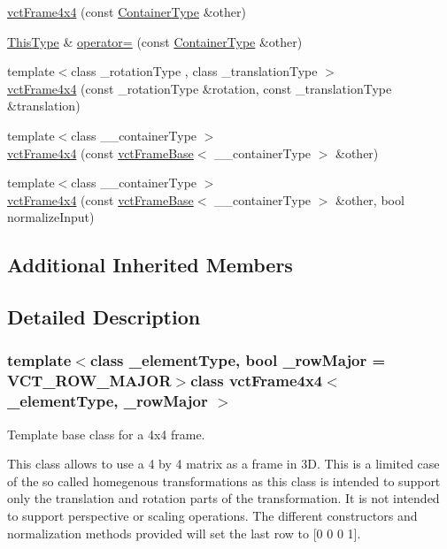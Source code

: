 \begin{DoxyCompactItemize}
\item 
\hyperlink{classvct_frame4x4_a6e99def3bd273940c3a50a67d0e2ae7c}{vct\-Frame4x4} (const \hyperlink{classvct_frame4x4_a3174a2ddafc9ae2b74009bab0c2b47c4}{Container\-Type} \&other)
\item 
\hyperlink{classvct_fixed_size_const_matrix_base_a7ec66a96ed7e08ce9ff54093133c9d8d}{This\-Type} \& \hyperlink{classvct_frame4x4_a1a098a9b58af05a8c4478907ddc74503}{operator=} (const \hyperlink{classvct_frame4x4_a3174a2ddafc9ae2b74009bab0c2b47c4}{Container\-Type} \&other)
\item 
{\footnotesize template$<$class \-\_\-rotation\-Type , class \-\_\-translation\-Type $>$ }\\\hyperlink{classvct_frame4x4_aa7c99db4ba56f170f4207fc0b88fc702}{vct\-Frame4x4} (const \-\_\-rotation\-Type \&rotation, const \-\_\-translation\-Type \&translation)
\item 
{\footnotesize template$<$class \-\_\-\-\_\-container\-Type $>$ }\\\hyperlink{classvct_frame4x4_a3566608875acd873ad5f691354deac14}{vct\-Frame4x4} (const \hyperlink{classvct_frame_base}{vct\-Frame\-Base}$<$ \-\_\-\-\_\-container\-Type $>$ \&other)
\item 
{\footnotesize template$<$class \-\_\-\-\_\-container\-Type $>$ }\\\hyperlink{classvct_frame4x4_ade017c77502d3cf628c259b061b48fbe}{vct\-Frame4x4} (const \hyperlink{classvct_frame_base}{vct\-Frame\-Base}$<$ \-\_\-\-\_\-container\-Type $>$ \&other, bool normalize\-Input)
\end{DoxyCompactItemize}
\subsection*{Additional Inherited Members}


\subsection{Detailed Description}
\subsubsection*{template$<$class \-\_\-element\-Type, bool \-\_\-row\-Major = V\-C\-T\-\_\-\-R\-O\-W\-\_\-\-M\-A\-J\-O\-R$>$class vct\-Frame4x4$<$ \-\_\-element\-Type, \-\_\-row\-Major $>$}

Template base class for a 4x4 frame. 

This class allows to use a 4 by 4 matrix as a frame in 3\-D. This is a limited case of the so called homegenous transformations as this class is intended to support only the translation and rotation parts of the transformation. It is not intended to support perspective or scaling operations. The different constructors and normalization methods provided will set the last row to \mbox{[}0 0 0 1\mbox{]}.



